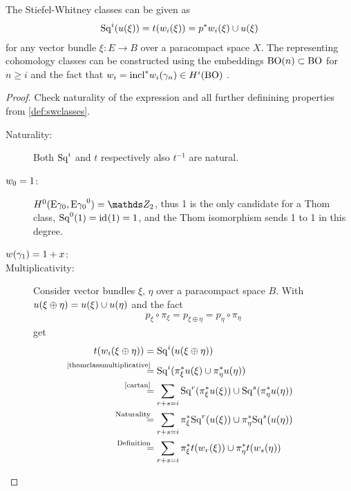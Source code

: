 \begin{Thm}\label{altdefswclasses}
  The Stiefel-Whitney classes can be given as
  \begin{gather*}
    \mathrm{Sq}^{i}(u(\xi)) = t(w_i(\xi)) = {p}^* w_i(\xi) \cup u(\xi)
  \end{gather*}
  for any vector bundle $\xi\colon E\to B$ over a paracompact space
  $X$.
  The representing cohomology classes can be constructed using the
  embeddings $\mathrm{BO}(n)\subset\mathrm{BO}$ for $n\geq i$ and the fact that
  $w_i={\mathrm{incl}}^*w_i(\gamma_n)\in H^i(\mathrm{BO})$ %
  .
  \begin{proof}
    Check naturality of the expression and all further
    definining properties from \ref{def:swclasses}.
    \begin{description}
    \item[Naturality:] Both $\mathrm{Sq}^{i}$ and $t$ respectively also $t^{-1}$
      are natural.
    \item[$w_0=1$:]
      $H^0(\thomspacepair{\E{\gamma_0}}) = \Zmod2$, thus 1 is the only
      candidate for a Thom class, $\mathrm{Sq}^{0}(1) = \mathrm{id}_{}(1) = 1$, and the Thom
      isomorphism sends 1 to 1 in this degree.
    \item[$w(\gamma_1)=1+x$:] %
    \item[Multiplicativity:] %
      Consider vector bundles $\xi$, $\eta$ over a paracompact space
      $B$. With $u(\xi\oplus\eta)=u(\xi)\cup u(\eta)$ and the fact
      \begin{gather}\label{projectionscommute}
        p_\xi\circ\pi_\xi = p_{\xi\oplus\eta} = p_\eta\circ\pi_\eta
      \end{gather}
      get
      \begin{align*}
        \thomiso(\w_i(\xi\oplus\eta))
        &= \Sq i(\u(\xi\oplus\eta)) \\
        &\overset{\mathllap{\text{\autoref{thomclassmultiplicative}}}}=
          \Sq i(\pb\pi_\xi\u(\xi) \cup \pb\pi_\eta\u(\eta))\\
        &\overset{\mathllap{\text{\ref{cartan}}}}=
          \sum_{r+s=i}
          \Sq r(\pb\pi_\xi\u(\xi)) \cup \Sq s(\pb \pi_\eta\u(\eta)) \\
        &\overset{\mathllap{\text{Naturality}}}=
          \sum_{r+s=i}
          \pb\pi_\xi\Sq r(\u(\xi)) \cup \pb \pi_\eta\Sq s(\u(\eta)) \\
        &\overset{\mathllap{\text{Definition}}}=
          \sum_{r+s=i}
          \pb\pi_\xi\thomiso(\w_r(\xi))
          \cup \pb\pi_\eta\thomiso(\w_s(\eta)) \\

\end{align*}
\end{description}
\end{proof}
\end{Thm}
